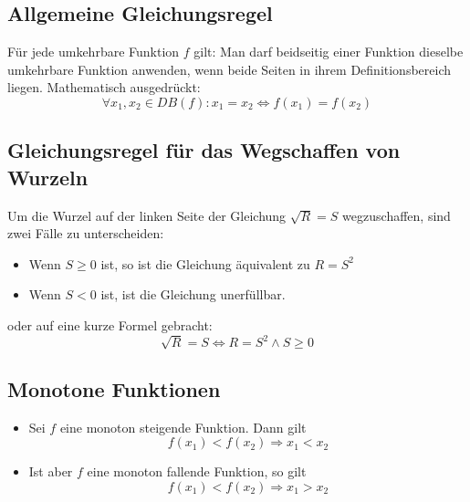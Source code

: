 \subsection{Allgemeine Gleichungsregel}

Für jede umkehrbare Funktion $f$ gilt: Man darf beidseitig einer Funktion dieselbe umkehrbare
Funktion anwenden, wenn beide Seiten in ihrem Definitionsbereich liegen. Mathematisch ausgedrückt:
%
\begin{displaymath}
	\forall x_1, x_2 \in DB(f): x_1 = x_2 \Leftrightarrow f(x_1) = f(x_2)
\end{displaymath}


\subsection{Gleichungsregel für das Wegschaffen von Wurzeln}

Um die Wurzel auf der linken Seite der Gleichung $\sqrt{R} = S$ wegzuschaffen, sind zwei Fälle zu unterscheiden:

\begin{itemize}
	\item Wenn $S \geq 0$ ist, so ist die Gleichung äquivalent zu $R = S^2$
	\item Wenn $S < 0$ ist, ist die Gleichung unerfüllbar.
\end{itemize}

oder auf eine kurze Formel gebracht:
\begin{displaymath}
	\sqrt{R} = S \Leftrightarrow R = S^2 \wedge S \geq 0
\end{displaymath}


\subsection{Monotone Funktionen}

\begin{itemize}
	\item Sei $f$ eine monoton steigende Funktion. Dann gilt
		\begin{displaymath}
			f(x_1) < f(x_2) \Rightarrow x_1 < x_2
		\end{displaymath}

	\item Ist aber $f$ eine monoton fallende Funktion, so gilt
		\begin{displaymath}
			f(x_1) < f(x_2) \Rightarrow x_1 > x_2
		\end{displaymath}
\end{itemize}


